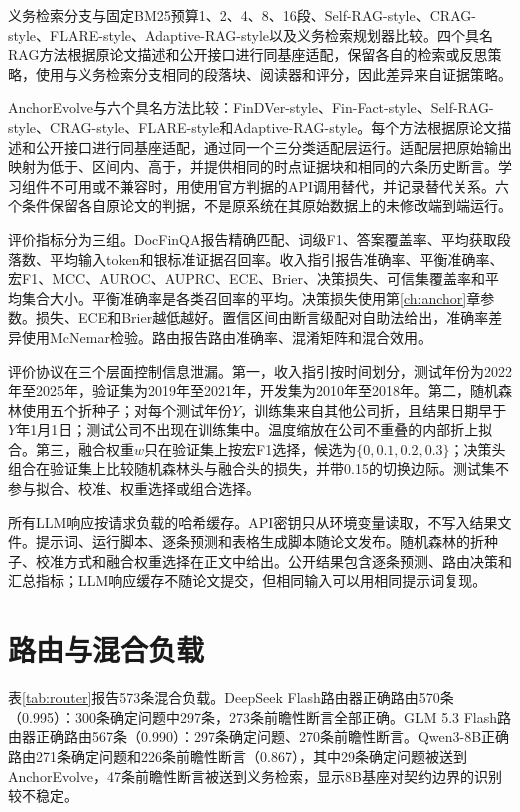 义务检索分支与固定BM25预算1、2、4、8、16段、Self-RAG-style、CRAG-style、FLARE-style、Adaptive-RAG-style以及义务检索规划器比较。四个具名RAG方法根据原论文描述和公开接口进行同基座适配，保留各自的检索或反思策略，使用与义务检索分支相同的段落块、阅读器和评分，因此差异来自证据策略。

AnchorEvolve与六个具名方法比较：FinDVer-style\citep{zhao2024findver}、Fin-Fact-style\citep{rangapur2025finfact}、Self-RAG-style\citep{asai2024selfrag}、CRAG-style\citep{yan2024crag}、FLARE-style\citep{jiang2023flare}和Adaptive-RAG-style\citep{jeong2024adaptiverag}。每个方法根据原论文描述和公开接口进行同基座适配，通过同一个三分类适配层运行。适配层把原始输出映射为低于、区间内、高于，并提供相同的时点证据块和相同的六条历史断言。学习组件不可用或不兼容时，用使用官方判据的API调用替代，并记录替代关系。六个条件保留各自原论文的判据，不是原系统在其原始数据上的未修改端到端运行。

评价指标分为三组。DocFinQA报告精确匹配、词级F1、答案覆盖率、平均获取段落数、平均输入token和银标准证据召回率。收入指引报告准确率、平衡准确率、宏F1、MCC、AUROC、AUPRC、ECE、Brier、决策损失、可信集覆盖率和平均集合大小。平衡准确率是各类召回率的平均\citep{brodersen2010balanced,sokolova2009performance}。决策损失使用第\ref{ch:anchor}章参数。损失、ECE和Brier越低越好。置信区间由断言级配对自助法给出，准确率差异使用McNemar检验。路由报告路由准确率、混淆矩阵和混合效用。

评价协议在三个层面控制信息泄漏。第一，收入指引按时间划分，测试年份为2022年至2025年，验证集为2019年至2021年，开发集为2010年至2018年。第二，随机森林使用五个折种子；对每个测试年份$Y$，训练集来自其他公司折，且结果日期早于$Y$年1月1日；测试公司不出现在训练集中。温度缩放在公司不重叠的内部折上拟合。第三，融合权重$w$只在验证集上按宏F1选择，候选为$\{0,0.1,0.2,0.3\}$；决策头组合在验证集上比较随机森林头与融合头的损失，并带0.15的切换边际。测试集不参与拟合、校准、权重选择或组合选择。

所有LLM响应按请求负载的哈希缓存。API密钥只从环境变量读取，不写入结果文件。提示词、运行脚本、逐条预测和表格生成脚本随论文发布。随机森林的折种子、校准方式和融合权重选择在正文中给出。公开结果包含逐条预测、路由决策和汇总指标；LLM响应缓存不随论文提交，但相同输入可以用相同提示词复现。

\section{路由与混合负载}

表\ref{tab:router}报告573条混合负载。DeepSeek Flash路由器正确路由570条（0.995）：300条确定问题中297条，273条前瞻性断言全部正确。GLM 5.3 Flash路由器正确路由567条（0.990）：297条确定问题、270条前瞻性断言。Qwen3-8B正确路由271条确定问题和226条前瞻性断言（0.867），其中29条确定问题被送到AnchorEvolve，47条前瞻性断言被送到义务检索，显示8B基座对契约边界的识别较不稳定。

